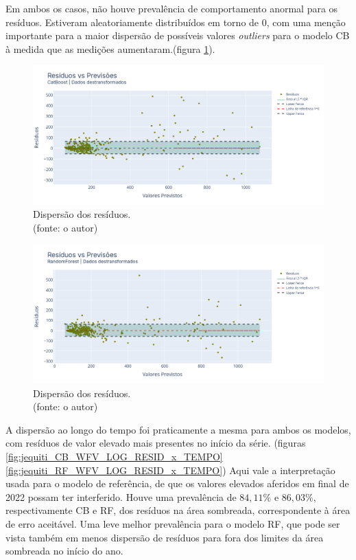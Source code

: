 Em ambos os casos, não houve prevalência de comportamento anormal para os resíduos. Estiveram aleatoriamente distribuídos em torno de $0$, com uma menção importante para a maior dispersão de possíveis valores \textit{outliers} para o modelo CB à medida que as medições aumentaram.(figura \ref{fig:jequiti_CB_WFV_LOG_RESID_x_PREV}).

\begin{figure}[!h]
\centering
\includegraphics[scale=0.33]{Figuras/jequiti/resultados/CB_WFV_LOG_RESID_x_PREV.png}
\caption{Dispersão dos resíduos.\\(fonte: o autor)}
\label{fig:jequiti_CB_WFV_LOG_RESID_x_PREV}
\end{figure}

\begin{figure}[!h]
\centering
\includegraphics[scale=0.33]{Figuras/jequiti/resultados/RF_WFV_LOG_RESID_x_PREV.png}
\caption{Dispersão dos resíduos.\\(fonte: o autor)}
\label{fig:jequiti_RF_WFV_LOG_RESID_x_PREV}
\end{figure}
\clearpage

A dispersão ao longo do tempo foi praticamente a mesma para ambos os modelos, com resíduos de valor elevado mais presentes no início da série. (figuras \ref{fig:jequiti_CB_WFV_LOG_RESID_x_TEMPO} \ref{fig:jequiti_RF_WFV_LOG_RESID_x_TEMPO}) Aqui vale a interpretação usada para o modelo de referência, de que os valores elevados aferidos em final de 2022 possam ter interferido. Houve uma prevalência de $84,11\%$ e $86,03\%$, respectivamente CB e RF, dos resíduos na área sombreada, correspondente à área de erro aceitável. Uma leve melhor prevalência para o modelo RF, que pode ser vista também em menos dispersão de resíduos para fora dos limites da área sombreada no início do ano.

